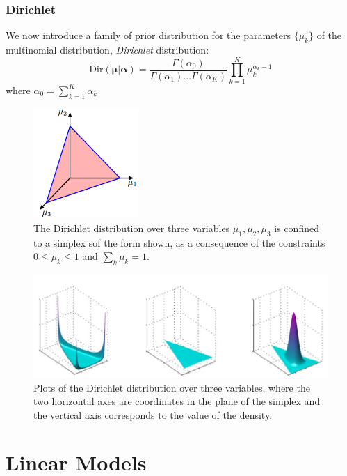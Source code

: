 \documentclass[a4paper, 12pt]{book} %
\begin{document}
\subsection{Dirichlet}
We now introduce a family of prior distribution for the parameters $\{\mu_k\}$ of the multinomial distribution, \emph{Dirichlet} distribution:
\begin{equation}
\mathrm{Dir}{(\boldsymbol{\mu}|\boldsymbol{\alpha})}=\frac{\Gamma{(\alpha_0)}}{\Gamma{(\alpha_1)}...\Gamma{(\alpha_K)}}\prod_{k=1}^{K}{\mu_{k}^{\alpha_k-1}}
\end{equation}
where $\alpha_0=\sum_{k=1}^{K}\alpha_k$
\begin{figure}[htpb]
	\centering
	\includegraphics[width=4cm]{figures/dirichlet_simplex.png}
	\caption{The Dirichlet distribution over three variables $\mu_1, \mu_2, \mu_3$
		is confined to a simplex sof
the form shown, as a consequence of the constraints
$0\le \mu_k \le 1$ and $\sum_k{\mu_k} = 1$.}
	\label{fig:boat1}
\end{figure}
\begin{figure}[htpb]
	\centering
	\includegraphics[width=\linewidth]{figures/dirichlet_dist.png}
	\caption{Plots of the Dirichlet distribution over three variables, where the two horizontal axes are coordinates
in the plane of the simplex and the vertical axis corresponds to the value of the density.}
	\label{fig:boat1}
\end{figure}


\chapter{Linear Models}
\end{document}

